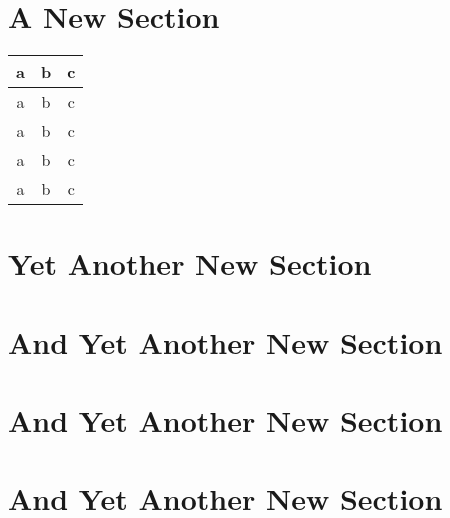 \lipsum[1]

\lipsum[1]


\section{A New Section}
\lipsum[1-2]
\begin{samepage}
\begin{longtable}{|c|c|c|} \hline
a & b & c \\ \hline
a & b & c \\
a & b & c \\
a & b & c \\
a & b & c \\ \hline
\end{longtable}
\end{samepage}

\section{Yet Another New Section}
\lipsum[3-4]

\section{And Yet Another New Section}
\lipsum[3-4]

\section{And Yet Another New Section}
\lipsum[3-4]

\section{And Yet Another New Section}
\lipsum[3-4]



\cleardoublepage
{}
\begin{thebibliography}{999}

\end{thebibliography}


\cleardoublepage
{}
\printindex



